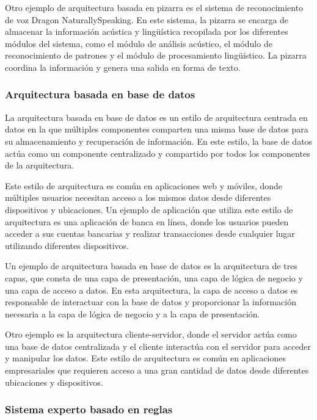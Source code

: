 \documentclass[executivepaper]{article}
\begin{document}
Otro ejemplo de arquitectura basada en pizarra es el sistema de reconocimiento de voz Dragon NaturallySpeaking. En este sistema, la pizarra se encarga de almacenar la información acústica y lingüística recopilada por los diferentes módulos del sistema, como el módulo de análisis acústico, el módulo de reconocimiento de patrones y el módulo de procesamiento lingüístico. La pizarra coordina la información y genera una salida en forma de texto.

\subsubsection*{Arquitectura basada en base de datos}

La arquitectura basada en base de datos es un estilo de arquitectura centrada en datos en la que múltiples componentes comparten una misma base de datos para su almacenamiento y recuperación de información. En este estilo, la base de datos actúa como un componente centralizado y compartido por todos los componentes de la arquitectura.

Este estilo de arquitectura es común en aplicaciones web y móviles, donde múltiples usuarios necesitan acceso a los mismos datos desde diferentes dispositivos y ubicaciones. Un ejemplo de aplicación que utiliza este estilo de arquitectura es una aplicación de banca en línea, donde los usuarios pueden acceder a sus cuentas bancarias y realizar transacciones desde cualquier lugar utilizando diferentes dispositivos.

Un ejemplo de arquitectura basada en base de datos es la arquitectura de tres capas, que consta de una capa de presentación, una capa de lógica de negocio y una capa de acceso a datos. En esta arquitectura, la capa de acceso a datos es responsable de interactuar con la base de datos y proporcionar la información necesaria a la capa de lógica de negocio y a la capa de presentación.

Otro ejemplo es la arquitectura cliente-servidor, donde el servidor actúa como una base de datos centralizada y el cliente interactúa con el servidor para acceder y manipular los datos. Este estilo de arquitectura es común en aplicaciones empresariales que requieren acceso a una gran cantidad de datos desde diferentes ubicaciones y dispositivos.

\subsubsection*{Sistema experto basado en reglas}
\end{document}
